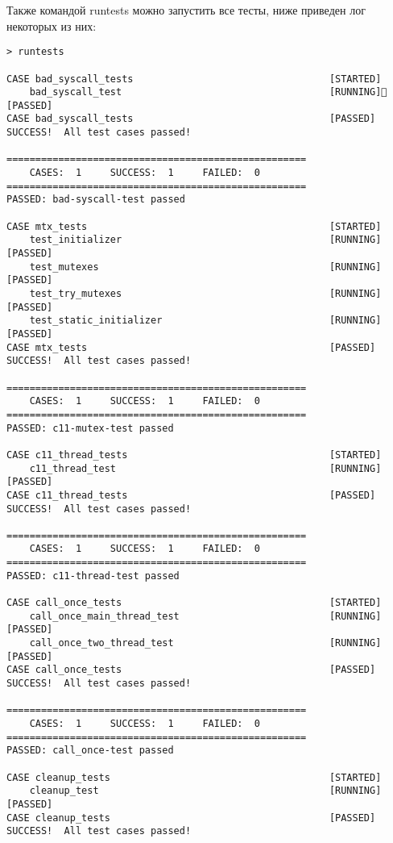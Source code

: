 \documentclass[14pt,a4paper]{article}
\begin{document}
Также командой runtests можно запустить все тесты, ниже приведен лог некоторых из них: 
\begin{lstlisting}
> runtests

CASE bad_syscall_tests                                  [STARTED] 
    bad_syscall_test                                    [RUNNING] [PASSED] 
CASE bad_syscall_tests                                  [PASSED]
SUCCESS!  All test cases passed!

====================================================
    CASES:  1     SUCCESS:  1     FAILED:  0   
====================================================
PASSED: bad-syscall-test passed

CASE mtx_tests                                          [STARTED] 
    test_initializer                                    [RUNNING] [PASSED] 
    test_mutexes                                        [RUNNING] [PASSED] 
    test_try_mutexes                                    [RUNNING] [PASSED] 
    test_static_initializer                             [RUNNING] [PASSED] 
CASE mtx_tests                                          [PASSED]
SUCCESS!  All test cases passed!

====================================================
    CASES:  1     SUCCESS:  1     FAILED:  0   
====================================================
PASSED: c11-mutex-test passed

CASE c11_thread_tests                                   [STARTED] 
    c11_thread_test                                     [RUNNING] [PASSED] 
CASE c11_thread_tests                                   [PASSED]
SUCCESS!  All test cases passed!

====================================================
    CASES:  1     SUCCESS:  1     FAILED:  0   
====================================================
PASSED: c11-thread-test passed

CASE call_once_tests                                    [STARTED] 
    call_once_main_thread_test                          [RUNNING] [PASSED] 
    call_once_two_thread_test                           [RUNNING] [PASSED] 
CASE call_once_tests                                    [PASSED]
SUCCESS!  All test cases passed!

====================================================
    CASES:  1     SUCCESS:  1     FAILED:  0   
====================================================
PASSED: call_once-test passed

CASE cleanup_tests                                      [STARTED] 
    cleanup_test                                        [RUNNING] [PASSED] 
CASE cleanup_tests                                      [PASSED]
SUCCESS!  All test cases passed!


\end{lstlisting}
\end{document}
